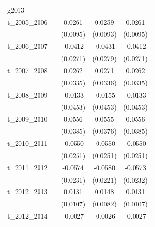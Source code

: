 \begin{table}[htbp]
\begin{tabular}{l*{4}{c}}
\hline
g2013       &                     &                     &                     &                     \\
t\_2005\_2006 &                     &      0.0261\sym{***}&      0.0259\sym{***}&      0.0261\sym{***}\\
            &                     &    (0.0095)         &    (0.0093)         &    (0.0095)         \\
[1em]
t\_2006\_2007 &                     &     -0.0412         &     -0.0431         &     -0.0412         \\
            &                     &    (0.0271)         &    (0.0279)         &    (0.0271)         \\
[1em]
t\_2007\_2008 &                     &      0.0262         &      0.0271         &      0.0262         \\
            &                     &    (0.0335)         &    (0.0336)         &    (0.0335)         \\
[1em]
t\_2008\_2009 &                     &     -0.0133         &     -0.0155         &     -0.0133         \\
            &                     &    (0.0453)         &    (0.0453)         &    (0.0453)         \\
[1em]
t\_2009\_2010 &                     &      0.0556         &      0.0555         &      0.0556         \\
            &                     &    (0.0385)         &    (0.0376)         &    (0.0385)         \\
[1em]
t\_2010\_2011 &                     &     -0.0550\sym{**} &     -0.0550\sym{**} &     -0.0550\sym{**} \\
            &                     &    (0.0251)         &    (0.0251)         &    (0.0251)         \\
[1em]
t\_2011\_2012 &                     &     -0.0574\sym{**} &     -0.0580\sym{***}&     -0.0573\sym{**} \\
            &                     &    (0.0231)         &    (0.0221)         &    (0.0232)         \\
[1em]
t\_2012\_2013 &                     &      0.0131         &      0.0148\sym{*}  &      0.0131         \\
            &                     &    (0.0107)         &    (0.0082)         &    (0.0107)         \\
[1em]
t\_2012\_2014 &                     &     -0.0027         &     -0.0026         &     -0.0027         \\

\end{tabular}
\end{table}
